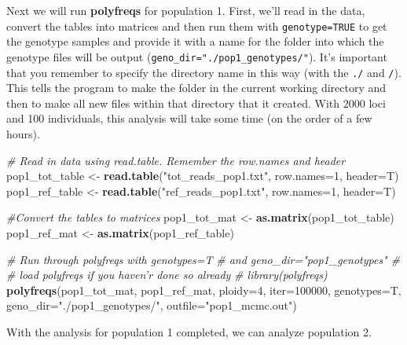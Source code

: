 \documentclass[]{article}
\newenvironment{Shaded}{\begin{snugshade}}{\end{snugshade}}
\newcommand{\KeywordTok}[1]{\textcolor[rgb]{0.13,0.29,0.53}{\textbf{{#1}}}}
\newcommand{\DataTypeTok}[1]{\textcolor[rgb]{0.13,0.29,0.53}{{#1}}}
\newcommand{\DecValTok}[1]{\textcolor[rgb]{0.00,0.00,0.81}{{#1}}}
\newcommand{\StringTok}[1]{\textcolor[rgb]{0.31,0.60,0.02}{{#1}}}
\newcommand{\CommentTok}[1]{\textcolor[rgb]{0.56,0.35,0.01}{\textit{{#1}}}}
\newcommand{\NormalTok}[1]{{#1}}
\begin{document}
Next we will run \textbf{polyfreqs} for population 1. First, we'll read
in the data, convert the tables into matrices and then run them with
\texttt{genotype=TRUE} to get the genotype samples and provide it with a
name for the folder into which the genotype files will be output
(\texttt{geno\_dir="./pop1\_genotypes/"}). It's important that you
remember to specify the directory name in this way (with the \texttt{./}
and \texttt{/}). This tells the program to make the folder in the
current working directory and then to make all new files within that
directory that it created. With 2000 loci and 100 individuals, this
analysis will take some time (on the order of a few hours).

\begin{Shaded}
\begin{Highlighting}[]
\CommentTok{# Read in data using read.table. Remember the row.names and header}
\NormalTok{pop1_tot_table <-}\StringTok{ }\KeywordTok{read.table}\NormalTok{(}\StringTok{"tot_reads_pop1.txt"}\NormalTok{, }\DataTypeTok{row.names=}\DecValTok{1}\NormalTok{, }\DataTypeTok{header=}\NormalTok{T)}
\NormalTok{pop1_ref_table <-}\StringTok{ }\KeywordTok{read.table}\NormalTok{(}\StringTok{"ref_reads_pop1.txt"}\NormalTok{, }\DataTypeTok{row.names=}\DecValTok{1}\NormalTok{, }\DataTypeTok{header=}\NormalTok{T)}

\CommentTok{#Convert the tables to matrices}
\NormalTok{pop1_tot_mat <-}\StringTok{ }\KeywordTok{as.matrix}\NormalTok{(pop1_tot_table)}
\NormalTok{pop1_ref_mat <-}\StringTok{ }\KeywordTok{as.matrix}\NormalTok{(pop1_ref_table)}

\CommentTok{# Run through polyfreqs with genotypes=T}
\CommentTok{# and geno_dir="pop1_genotypes"}
\CommentTok{#}
\CommentTok{# load polyfreqs if you haven'r done so already}
\CommentTok{# library(polyfreqs)}
\KeywordTok{polyfreqs}\NormalTok{(pop1_tot_mat, pop1_ref_mat, }\DataTypeTok{ploidy=}\DecValTok{4}\NormalTok{, }
          \DataTypeTok{iter=}\DecValTok{100000}\NormalTok{, }\DataTypeTok{genotypes=}\NormalTok{T, }\DataTypeTok{geno_dir=}\StringTok{"./pop1_genotypes/"}\NormalTok{, }\DataTypeTok{outfile=}\StringTok{"pop1_mcmc.out"}\NormalTok{)}
\end{Highlighting}
\end{Shaded}

With the analysis for population 1 completed, we can analyze population
2.
\end{document}
